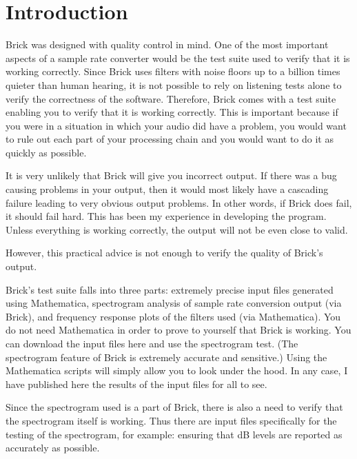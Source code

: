 \documentclass[10pt]{article}
\begin{document}
\title{}
\author{}
\date{}
\maketitle

\section*{Introduction}

Brick was designed with quality control in mind. One of the most important aspects of a sample rate converter would be the test suite used to verify that it is working correctly. Since Brick uses filters with noise floors up to a billion times quieter than human hearing, it is not possible to rely on listening tests alone to verify the correctness of the software. Therefore, Brick comes with a test suite enabling you to verify that it is working correctly. This is important because if you were in a situation in which your audio did have a problem, you would want to rule out each part of your processing chain and you would want to do it as quickly as possible.

It is very unlikely that Brick will give you incorrect output. If there was a bug causing problems in your output, then it would most likely have a cascading failure leading to very obvious output problems. In other words, if Brick does fail, it should fail hard. This has been my experience in developing the program. Unless everything is working correctly, the output will not be even close to valid.

However, this practical advice is not enough to verify the quality of Brick's output.

Brick's test suite falls into three parts: extremely precise input files generated using Mathematica, spectrogram analysis of sample rate conversion output (via Brick), and frequency response plots of the filters used (via Mathematica). You do not need Mathematica in order to prove to yourself that Brick is working. You can download the input files here and use the spectrogram test. (The spectrogram feature of Brick is extremely accurate and sensitive.) Using the Mathematica scripts will simply allow you to look under the hood. In any case, I have published here the results of the input files for all to see.

Since the spectrogram used is a part of Brick, there is also a need to verify that the spectrogram itself is working. Thus there are input files specifically for the testing of the spectrogram, for example: ensuring that dB levels are reported as accurately as possible.
\end{document}
